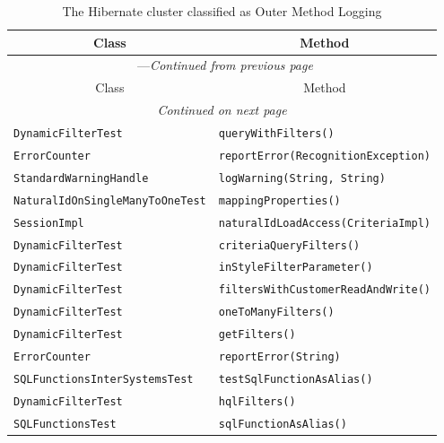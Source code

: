 \begin{center}
\begin{longtable}{ll}
\caption{The Hibernate cluster classified as Outer Method Logging}\\
\toprule\multicolumn{1}{c}{Class}&\multicolumn{1}{c}{Method}\\\midrule
\endfirsthead

\multicolumn{2}{c}{\tablename\ \thetable{}---\textit{Continued from previous page}} \\\midrule
\multicolumn{1}{c}{Class}&\multicolumn{1}{c}{Method}\\\midrule
\endhead
\multicolumn{2}{c}{\textit{Continued on next page}}\\\midrule
\endfoot
\bottomrule
\endlastfoot

\lstinline/DynamicFilterTest/&{\lstinline/queryWithFilters()/}\\
\lstinline/ErrorCounter/&{\lstinline/reportError(RecognitionException)/}\\
\lstinline/StandardWarningHandle/&{\lstinline/logWarning(String, String)/}\\
\lstinline/NaturalIdOnSingleManyToOneTest/&{\lstinline/mappingProperties()/}\\
\lstinline/SessionImpl/&{\lstinline/naturalIdLoadAccess(CriteriaImpl)/}\\
\lstinline/DynamicFilterTest/&{\lstinline/criteriaQueryFilters()/}\\
\lstinline/DynamicFilterTest/&{\lstinline/inStyleFilterParameter()/}\\
\lstinline/DynamicFilterTest/&{\lstinline/filtersWithCustomerReadAndWrite()/}\\
\lstinline/DynamicFilterTest/&{\lstinline/oneToManyFilters()/}\\
\lstinline/DynamicFilterTest/&{\lstinline/getFilters()/}\\
\lstinline/ErrorCounter/&{\lstinline/reportError(String)/}\\
\lstinline/SQLFunctionsInterSystemsTest/&{\lstinline/testSqlFunctionAsAlias()/}\\
\lstinline/DynamicFilterTest/&{\lstinline/hqlFilters()/}\\
\lstinline/SQLFunctionsTest/&{\lstinline/sqlFunctionAsAlias()/}\\
\end{longtable}
\end{center}


